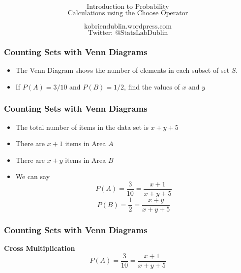 \documentclass[IntroMain.tex]{subfiles}
\begin{document}

\begin{frame}
\Huge
\[\mbox{Introduction to Probability}\]
\LARGE
\[\mbox{Calculations using the Choose Operator}\]

\Large
\[\mbox{kobriendublin.wordpress.com}\]
\[\mbox{Twitter: @StatsLabDublin}\]

\end{frame}


\begin{frame}
\frametitle{Counting Sets with Venn Diagrams}
\Large
\vspace{-2cm}
\begin{itemize}
\item The Venn Diagram shows the number of elements in each subset of set $S$.
\item If $P(A) = 3/10$ and $P(B) = 1/2$, find the values of $x$ and $y$
\end{itemize}
\end{frame}



\begin{frame}
\frametitle{Counting Sets with Venn Diagrams}
\Large
\vspace{-1cm}
\begin{itemize}
\item The total number of items in the data set is $x+y+5$
\item There are $x+1$ items in Area $A$
\item There are $x+y$ items in Area $B$
\item We can say
\[ P(A) = \frac{3}{10} = \frac{x+1}{x+y+5}\]
\[ P(B) = \frac{1}{2} = \frac{x+y}{x+y+5} \]
\end{itemize}
\end{frame}



\begin{frame}
\frametitle{Counting Sets with Venn Diagrams}
\Large
\vspace{-2.5cm}
\textbf{Cross Multiplication}
\[ P(A) = \frac{3}{10} = \frac{x+1}{x+y+5}\]

\end{frame}
\end{document}

